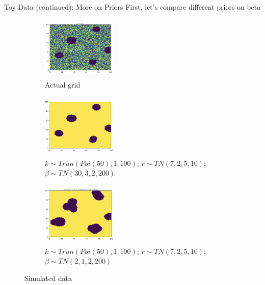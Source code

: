 \documentclass[10pt,mathserif]{beamer}
\begin{document}
\begin{frame}{Toy Data (continued): More on Priors}
First, let's compare different priors on beta
\begin{figure}[t!]
    \centering
    \begin{subfigure}[t]{0.3\textwidth}
        \centering
        \includegraphics[height=1.2in, width=1.4in]{../BDC_gridactual}
        \caption{Actual grid}
    \end{subfigure}%
    \begin{subfigure}[t]{0.3\textwidth}
        \centering
        \includegraphics[height=1.2in, width=1.4in]{../BDC_grid2_strongsig}
        \caption{ $k \sim Trun(Poi(50), 1, 100)$; $r \sim TN(7, 2, 5, 10)$; $\beta \sim TN(30, 3, 2, 200)$}
    \end{subfigure}%
        \begin{subfigure}[t]{0.3\textwidth}
        \centering
        \includegraphics[height=1.2in, width=1.4in]{../BDC_grid3_weaksig}
        \caption{ $k \sim Trun(Poi(50), 1, 100)$; $r \sim TN(7, 2, 5, 10)$; \textbf{$\beta \sim TN(2, 1, 2, 200)$}}
    \end{subfigure}
    \caption{Simulated data}
\end{figure}
\end{frame}
\end{document}
